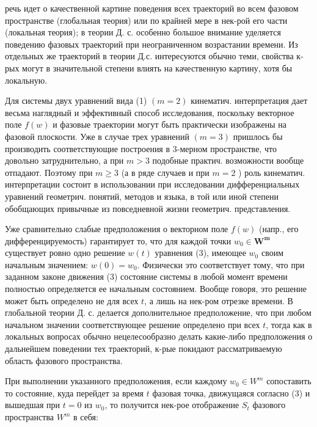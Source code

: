 \documentclass[10pt]{article}
\begin{document}
речь идет о качественной картине поведения всех траекторий во всем фазовом пространстве (глобальная теория) или по крайней мере в нек-рой его части (локальная теория); в теории Д. с. особенно большое внимание уделяется поведению фазовых траекторий при неограниченном возрастании времени. Из отдельных же траекторий в теории Д.с. интересуются обычно теми, свойства к-рых могут в значительной степени влиять на качественную картину, хотя бы локальную.



Для системы двух уравнений вида (1) $(m=2)$ кинематич. интерпретация дает весьма наглядный и эффективный способ исследования, поскольку векторное поле $f(w)$ и фазовые траектории могут быть практически изображены на фазовой плоскости. Уже в случае трех уравнений $(m=3)$ пришлось бы производить соответствующие построения в 3-мерном пространстве, что довольно затруднительно, а при $m>3$ подобные практич. возможности вообще отпадают. Поэтому при $m \geqslant 3$ (а в ряде случаев и при $m=2$ ) роль кинематич. интерпретации состоит в использовании при исследовании дифференциальных уравнений геометрич. понятий, методов и языка, в той или иной степени обобщающих привычные из повседневной жизни геометрич. представления.



Уже сравнительно слабые предположения о векторном поле $f(w)$ (напр., его дифференцируемость) гарантирует то, что для каждой точки $w_{0} \in \boldsymbol{W}^{\boldsymbol{m}}$ существует ровно одно решение $w(t)$ уравнения (3), имеющее $w_{0}$ своим начальным значением: $w(0)=w_{0}$. Физически это соответствует тому, что при заданном законе движения (3) состояние системы в любой момент времени полностью определяется ее начальным состоянием. Вообще говоря, это решение может быть определено не для всех $t$, а лишь на нек-ром отрезке времени. В глобальной теории Д. с. делается дополнительное предположение, что при любом начальном значении соответствующее решение определено при всех $t$, тогда как в локальных вопросах обычно нецелесообразно делать какие-либо предположения о дальнейшем поведении тех траекторий, к-рые покидают рассматриваемую область фазового пространства.



При выполнении указанного предположения, если каждому $w_{0} \in W^{m}$ сопоставить то состояние, куда перейдет за время $t$ фазовая точка, движущаяся согласно (3) и вышедшая при $t=0$ из $w_{0}$, то получится нек-рое отображение $S_{t}$ фазового пространства $W^{m}$ в себя:
\end{document}
